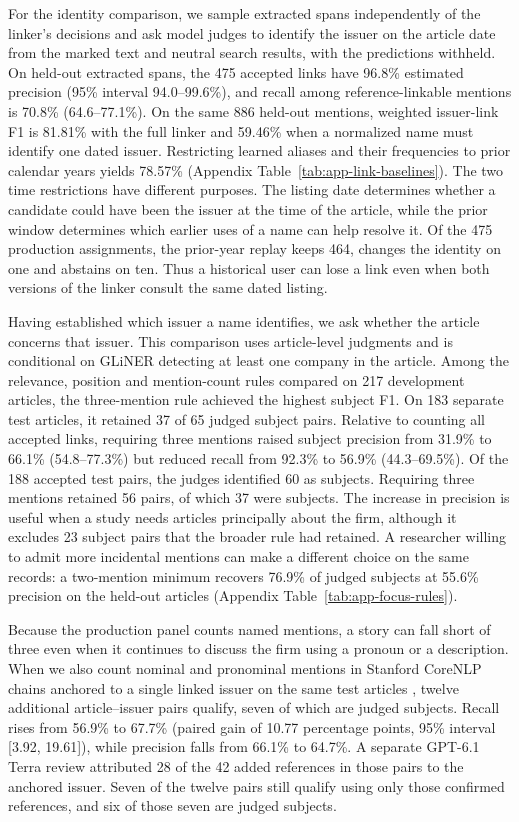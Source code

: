 For the identity comparison, we sample extracted spans independently of
the linker's decisions and ask model judges to identify the issuer on
the article date from the marked text and neutral search results, with
the predictions withheld. On held-out extracted spans,
the 475 accepted links have 96.8\% estimated precision (95\% interval
94.0--99.6\%), and recall among reference-linkable mentions is 70.8\%
(64.6--77.1\%). On the same 886 held-out mentions, weighted issuer-link
F1 is 81.81\% with the full linker and 59.46\% when a normalized name
must identify one dated issuer. Restricting learned aliases and their
frequencies to prior calendar years yields 78.57\%
(Appendix Table~\ref{tab:app-link-baselines}). The two time restrictions
have different purposes. The listing date determines whether a candidate
could have been the issuer at the time of the article, while the prior
window determines which earlier uses of a name can help resolve it.
Of the 475 production assignments, the prior-year replay keeps 464,
changes the identity on one and abstains on ten. Thus a historical user
can lose a link even when both versions of the linker consult the same
dated listing.

Having established which issuer a name identifies, we ask whether the
article concerns that issuer. This comparison uses article-level
judgments and is conditional on GLiNER detecting at least one company
in the article. Among the relevance, position and mention-count rules
compared on 217 development articles, the three-mention rule achieved
the highest subject F1. On 183 separate test articles, it retained 37
of 65 judged subject pairs. Relative to counting all accepted links,
requiring three mentions raised subject precision from 31.9\% to 66.1\%
(54.8--77.3\%) but reduced recall from 92.3\% to 56.9\%
(44.3--69.5\%). Of the 188 accepted test pairs, the judges identified
60 as subjects. Requiring three mentions retained 56 pairs, of which
37 were subjects. The increase in precision is useful when a study
needs articles principally about the firm, although it excludes 23 subject pairs
that the broader rule had retained. A researcher willing to admit
more incidental
mentions can make a different choice on the same records: a two-mention
minimum recovers 76.9\% of judged subjects at 55.6\% precision on the
held-out articles (Appendix Table~\ref{tab:app-focus-rules}).

Because the production panel counts named mentions, a story can fall
short of three even when it continues to discuss the firm using a
pronoun or a description. When we also count nominal and pronominal
mentions in Stanford CoreNLP chains anchored to a single linked issuer
on the same test articles \citep{manning2014corenlp}, twelve additional
article--issuer pairs qualify, seven of which are judged subjects.
Recall rises from 56.9\% to 67.7\% (paired gain of 10.77 percentage
points, 95\% interval [3.92, 19.61]), while precision falls from
66.1\% to 64.7\%. A separate GPT-6.1 Terra review attributed 28 of
the 42 added references in those pairs to the anchored issuer. Seven
of the twelve pairs still qualify using only those confirmed references,
and six of those seven are judged subjects.

